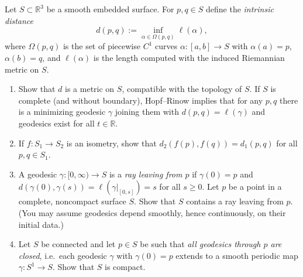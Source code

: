 \begin{problem}
\label{prob:cp-vii-0059}
Let $S\subset\mathbb R^3$ be a smooth embedded surface. For $p,q\in S$ define the \emph{intrinsic distance}
	\[
	d(p,q):=\inf_{\alpha\in\Omega(p,q)} \ell(\alpha),
	\]
	where $\Omega(p,q)$ is the set of piecewise $C^1$ curves $\alpha:[a,b]\to S$ with $\alpha(a)=p$, $\alpha(b)=q$, and
	$\ell(\alpha)$ is the length computed with the induced Riemannian metric on $S$.
	\begin{enumerate}
		\item Show that $d$ is a metric on $S$, compatible with the topology of $S$.
		If $S$ is complete (and without boundary), Hopf--Rinow implies that for any $p,q$ there is a minimizing geodesic
		$\gamma$ joining them with $d(p,q)=\ell(\gamma)$ and geodesics exist for all $t\in\mathbb R$.
		\item[(i)] If $f:S_1\to S_2$ is an isometry, show that $d_2(f(p),f(q))=d_1(p,q)$ for all $p,q\in S_1$.
		\item[(ii)] A geodesic $\gamma:[0,\infty)\to S$ is a \emph{ray leaving from $p$} if $\gamma(0)=p$ and
		$d(\gamma(0),\gamma(s))=\ell(\gamma|_{[0,s]})=s$ for all $s\ge 0$. Let $p$ be a point in a complete, noncompact surface $S$.
		Show that $S$ contains a ray leaving from $p$. (You may assume geodesics depend smoothly, hence continuously, on their initial data.)
		\item[(iii)] Let $S$ be connected and let $p\in S$ be such that \emph{all geodesics through $p$ are closed}, i.e.\ each geodesic
		$\gamma$ with $\gamma(0)=p$ extends to a smooth periodic map $\gamma:S^1\to S$. Show that $S$ is compact.
	\end{enumerate}
	
	\medskip
\end{problem}

